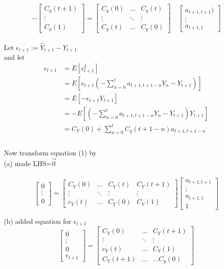 \documentclass[11pt]{article}
\begin{document}
{\begin{equation}
-\begin{bmatrix}
C_y(t+1)\\
\vdots\\
C_y(1)
\end{bmatrix}
= \begin{bmatrix}
C_y(0) & \ldots & C_y(t)\\
\vdots & \ddots & \vdots\\
C_y(t) & \ldots & C_y(0)
\end{bmatrix}\quad 
\begin{bmatrix}
a_{t+1,t+1})\\
\vdots\\
a_{t+1,1}
\end{bmatrix}
\end{equation}\\
Let $\epsilon_{t+1} := \hat{Y}_{t+1}-Y_{t+1}$ \\
and let\begin{align*} \epsilon_{t+1} &= E[\epsilon_{t+1}^2]\\
&= E[\epsilon_{t+1}(-\sum_{n=0}^t a_{t+1,t+1-n}Y_n-Y_{t+1})]\\
&= E[-\epsilon_{t+1}Y_{t+1}]\\
&= -E[(-\sum_{n=0}^t a_{t+1,t+1-n}Y_n-Y_{t+1})Y_{t+1}]\\
&= C_Y(0)+\sum_{n=0}^t C_y(t+1-n)a_{t+1,t+1-n}\\
\end{align*}\\
Now transform equation (1) by\\
(a) made LHS=$\vec{0}$\\
 \\
\[
\begin{bmatrix}
0\\
\vdots\\
0 
\end{bmatrix} = 
\begin{bmatrix}
C_Y(0) &\ldots &C_Y(t) &C_Y(t+1)\\
\vdots &\ddots &\vdots &\vdots\\
c_Y(t) &\ldots &C_Y(0) &C_Y(1)

\end{bmatrix}
\begin{bmatrix}
a_{t+1,t+1}\\
\vdots\\
a_{t+1,1}\\
1
\end{bmatrix}
\]


(b) added equation for $\epsilon_{t+1}$\\
\begin{equation}
\begin{bmatrix}
0\\
\vdots\\
0 \\
\epsilon_{t+1}
\end{bmatrix} = 
\begin{bmatrix}
C_Y(0) &\ldots &C_Y(t+1)\\
\vdots &\ddots &\vdots\\
c_Y(t) &\ldots &C_Y(1)\\
C_Y(t+1) &\ldots &\ldots C_y(0)


\end{bmatrix}
\end{equation}}
\end{document}
